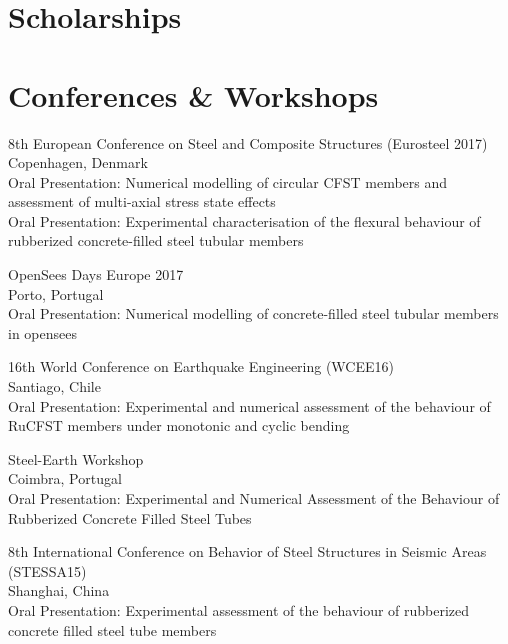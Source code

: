 \documentclass{../Template/my_cv}
\begin{document}
\section{Scholarships}




\section{Conferences \& Workshops}

 {
  8th European Conference on Steel and Composite Structures (Eurosteel 2017)\\

  Copenhagen, Denmark\\

  Oral Presentation: Numerical modelling of circular CFST members and assessment of multi-axial stress state effects\\

  Oral Presentation: Experimental characterisation of the flexural behaviour of rubberized concrete-filled steel tubular members
}

 {
  OpenSees Days Europe 2017\\

  Porto, Portugal\\
  Oral Presentation:  Numerical modelling of concrete-filled steel tubular members in opensees
}

 {
  16th World Conference on Earthquake Engineering (WCEE16)\\

  Santiago, Chile\\

  Oral Presentation: Experimental and numerical assessment of the behaviour of RuCFST members under monotonic and cyclic bending
}

 {
  Steel-Earth Workshop\\
  Coimbra, Portugal\\
  Oral Presentation: Experimental and Numerical Assessment of the Behaviour of Rubberized Concrete Filled Steel Tubes
}


 {
  8th International Conference on Behavior of Steel Structures in Seismic Areas (STESSA15)\\

  Shanghai, China\\
  
  Oral Presentation: Experimental assessment of the behaviour of rubberized concrete filled steel tube members
}
\end{document}
